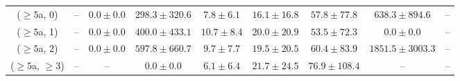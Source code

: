 \begin{table}[h!]
{\begin{tabular}{ccccccccc}
	($\ge5$a, 0) & -- & $0.0\pm 0.0$ & $298.3\pm 320.6$ & $7.8\pm 6.1$ & $16.1\pm 16.8$ & $57.8\pm 77.8$ & $638.3\pm 894.6$ & -- \\[0.5ex] 
	($\ge5$a, 1) & -- & $0.0\pm 0.0$ & $400.0\pm 433.1$ & $10.7\pm 8.4$ & $20.0\pm 20.9$ & $53.5\pm 72.3$ & $0.0\pm 0.0$ & -- \\[0.5ex] 
	($\ge5$a, 2) & -- & $0.0\pm 0.0$ & $597.8\pm 660.7$ & $9.7\pm 7.7$ & $19.5\pm 20.5$ & $60.4\pm 83.9$ & $1851.5\pm 3003.3$ & -- \\[0.5ex] 
	($\ge5$a, $\ge3$) & -- & -- & $0.0\pm 0.0$ & $6.1\pm 6.4$ & $21.7\pm 24.5$ & $76.9\pm 108.4$ & -- & -- \\[0.5ex] 
	\hline
	\hline
\end{tabular}}
\end{table}
